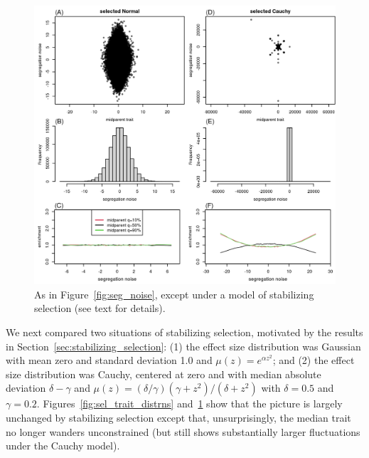 \documentclass{article}
\newcommand{\1}{\mathbbm{1}}
\theoremstyle{remark}
\theoremstyle{definition}
\begin{document}
\begin{figure}
    \begin{center}
        \includegraphics{sims/selected_seg_noise}
    \end{center}
    \caption{
        As in Figure~\ref{fig:seg_noise},
        except under a model of stabilizing selection (see text for details).
        \label{fig:sel_seg_noise}
    }
\end{figure}

We next compared two situations of stabilizing selection, motivated by the results
in Section~\ref{sec:stabilizing_selection}:
(1) the effect size distribution was Gaussian with mean zero and standard deviation 1.0
and $\mu(z) = e^{\alpha z^2}$; and
(2) the effect size distribution was Cauchy, centered at zero and with median absolute deviation $\delta - \gamma$
and $\mu(z) = (\delta/\gamma) (\gamma + z^2) / (\delta + z^2)$ with $\delta=0.5$ and $\gamma=0.2$.
Figures~\ref{fig:sel_trait_distrns} and~\ref{fig:sel_seg_noise}
show that the picture is largely unchanged by stabilizing selection
except that, unsurprisingly, the median trait no longer wanders unconstrained
(but still shows substantially larger fluctuations under the Cauchy model).
\end{document}
